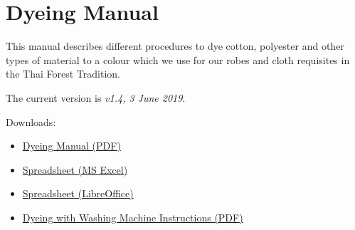 \chapter{Dyeing Manual}

This manual describes different procedures to dye cotton, polyester and
other types of material to a colour which we use for our robes and cloth
requisites in the Thai Forest Tradition.

The current version is \emph{v1.4, 3 June 2019}.

Downloads:

\begin{itemize}
\tightlist
\item
  \href{https://ticivara.github.io/dyeing-manual/Dyeing-Manual.pdf}{Dyeing
  Manual (PDF)}
\item
  \href{https://ticivara.github.io/dyeing-manual/Dyeing-Manual-Excel.xlsx}{Spreadsheet
  (MS Excel)}
\item
  \href{https://ticivara.github.io/dyeing-manual/Dyeing-Manual.ods}{Spreadsheet
  (LibreOffice)}
\item
  \href{https://ticivara.github.io/dyeing-manual/Dyeing-Instructions.pdf}{Dyeing
  with Washing Machine Instructions (PDF)}
\end{itemize}

